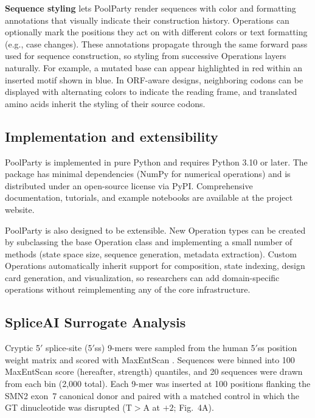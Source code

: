\documentclass[unnumsec,webpdf,modern,large]{mam-authoring-template}%
\theoremstyle{thmstyleone}%
\theoremstyle{thmstyletwo}%
\theoremstyle{thmstylethree}%
\begin{document}
\textbf{Sequence styling} lets PoolParty render sequences with color and formatting annotations that visually indicate their construction history. Operations can optionally mark the positions they act on with different colors or text formatting (e.g., case changes). These annotations propagate through the same forward pass used for sequence construction, so styling from successive Operations layers naturally. For example, a mutated base can appear highlighted in red within an inserted motif shown in blue. In ORF-aware designs, neighboring codons can be displayed with alternating colors to indicate the reading frame, and translated amino acids inherit the styling of their source codons.

\subsection{Implementation and extensibility}

PoolParty is implemented in pure Python and requires Python 3.10 or later. The package has minimal dependencies (NumPy for numerical operations) and is distributed under an open-source license via PyPI. Comprehensive documentation, tutorials, and example notebooks are available at the project website.

PoolParty is also designed to be extensible. New Operation types can be created by subclassing the base Operation class and implementing a small number of methods (state space size, sequence generation, metadata extraction). Custom Operations automatically inherit support for composition, state indexing, design card generation, and visualization, so researchers can add domain-specific operations without reimplementing any of the core infrastructure.

\subsection{SpliceAI Surrogate Analysis}

Cryptic 5$'$ splice-site (5$'$ss) 9-mers were sampled from the human 5$'$ss position weight matrix \citep{Wong2018quantitative} and scored with MaxEntScan \citep{Yeo2004me}. Sequences were binned into 100 MaxEntScan score (hereafter, strength) quantiles, and 20 sequences were drawn from each bin (2,000 total). Each 9-mer was inserted at 100 positions flanking the SMN2 exon~7 canonical donor and paired with a matched control in which the GT dinucleotide was disrupted (T$>$A at $+2$; Fig.~4A).
\end{document}
